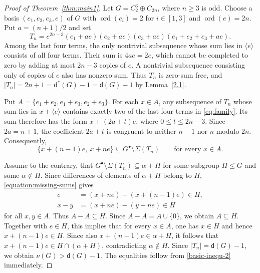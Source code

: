 \documentclass[10pt,a4paper]{amsart}
\newcommand{\dd}{\mathsf d}
\DeclareMathOperator{\ord}{ord}
\begin{document}
\begin{proof}[Proof of Theorem~\ref{thm:main1}]
Let $G=C_2^3\oplus C_{2n}$, where $n\ge3$ is odd.
Choose a basis $(e_1,e_2,e_3,e)$ of $G$ with $\ord(e_i)=2$
for $i \in [1,3]$ and $\ord(e)=2n$. Put $a=(n+1)/2$ and set
\begin{equation}\label{eq:family}
 T_n=e^{2n-3}(e_1+ae)(e_2+ae)(e_3+ae)
 (e_1+e_2+e_3+ae).
\end{equation}
Among the last four terms, the only nontrivial subsequence whose
sum lies in $\langle e\rangle$ consists of all four terms.
Their sum is $4ae=2e$, which cannot be completed to zero by
adding at most $2n-3$ copies of $e$. A nontrivial subsequence
consisting only of copies of $e$ also has nonzero sum.
Thus $T_n$ is zero-sum free, and $|T_n|=2n+1=\mathsf d^* (G)-1=\mathsf d (G)-1$ by Lemma~\ref{2.1}.

Put $A=\{e_1+e_2,e_1+e_3,e_2+e_3\}$. For each $x\in A$,
any subsequence of $T_n$ whose sum lies in $x+\langle e\rangle$
contains exactly two of the last four terms in \eqref{eq:family}.
Its sum therefore has the form $x+(2a+t)e$, where
$0\le t\le2n-3$. Since $2a=n+1$, the coefficient $2a+t$
is congruent to neither $n-1$ nor $n$ modulo $2n$.
Consequently,
\begin{equation}\label{equation:missing-sums}
 \{x+(n-1)e,\ x+ne\}
 \subseteq G^\bullet\setminus\Sigma(T_n)
 \qquad\text{for every }x\in A.
\end{equation}

Assume to the contrary, that
$G^\bullet\setminus\Sigma(T_n)\subseteq\alpha+H$
for some subgroup $H\le G$ and some $\alpha\notin H$.
Since differences of elements of $\alpha+H$ belong to $H$,
\eqref{equation:missing-sums} gives
\begin{align*}
 e   &= (x+ne)-(x+(n-1)e)\in H,\\
 x-y &= (x+ne)-(y+ne)\in H
\end{align*}
for all $x,y\in A$. Thus $A-A\subseteq H$.
Since $A-A=A\cup\{0\}$, we obtain $A\subseteq H$.
Together with $e\in H$, this implies that for every $x\in A$,
one has $x\in H$ and hence $x+(n-1)e\in H$.
Since also $x+(n-1)e\in\alpha+H$, it follows that $x+(n-1)e\in H\cap(\alpha+H)$, contradicting $\alpha\notin H$. Since $|T_n|=\dd(G)-1$, we obtain $\nu(G)>\dd(G)-1$.
The equalities follow from \eqref{basic-inequ-2} immediately.
\end{proof}

\medskip
\end{document}
